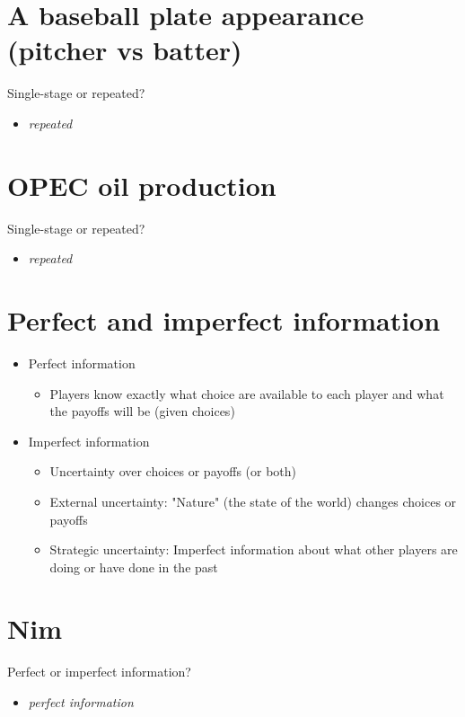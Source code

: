 \documentclass[11pt]{article}
\begin{document}
\section*{A baseball plate appearance (pitcher vs batter)}
\label{sec:org79a7ba4}
Single-stage or repeated?
\begin{itemize}
\item \emph{repeated}
\end{itemize}

\section*{OPEC oil production}
\label{sec:orgdced4e8}
Single-stage or repeated?
\begin{itemize}
\item \emph{repeated}
\end{itemize}

\section*{Perfect and imperfect information}
\label{sec:orgf061481}
\begin{itemize}
\item Perfect information
\begin{itemize}
\item Players know exactly what choice are available to each player and what the payoffs will be (given choices)
\end{itemize}
\item Imperfect information
\begin{itemize}
\item Uncertainty over choices or payoffs (or both)
\item External uncertainty: "Nature" (the state of the world) changes choices or payoffs
\item Strategic uncertainty: Imperfect information about what other players are doing or have done in the past
\end{itemize}
\end{itemize}

\section*{Nim}
\label{sec:org960ccc3}
Perfect or imperfect information?
\begin{itemize}
\item \emph{perfect information}
\end{itemize}
\end{document}
